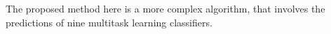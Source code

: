 
The proposed method here is a more complex algorithm, that
involves the predictions of nine multitask learning
classifiers.
